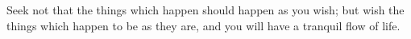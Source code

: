 Seek not that the  things which happen should happen as you  wish; but wish the
things which  happen to be as  they are, and you  will have a tranquil  flow of
life.
